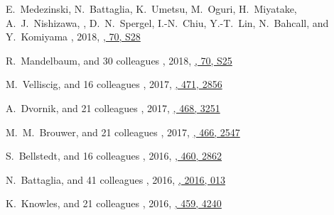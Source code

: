 \begin{etaremune}
\item
E.~Medezinski, N.~Battaglia, K.~Umetsu, M.~Oguri, H.~Miyatake, A.~J.~Nishizawa, \myself, D.~N.~Spergel, I.-N.~Chiu, Y.-T.~Lin, N.~Bahcall, and Y.~Komiyama
,
2018, \href{https://ui.adsabs.harvard.edu/abs/2018PASJ...70S..28M}{\pasj, 70, S28}

\item
R.~Mandelbaum, and 30 colleagues
,
2018, \href{https://ui.adsabs.harvard.edu/abs/2018PASJ...70S..25M}{\pasj, 70, S25}

\item
M.~Velliscig, and 16 colleagues
,
2017, \href{https://ui.adsabs.harvard.edu/abs/2017MNRAS.471.2856V}{\mnras, 471, 2856}

\item
A.~Dvornik, and 21 colleagues
,
2017, \href{https://ui.adsabs.harvard.edu/abs/2017MNRAS.468.3251D}{\mnras, 468, 3251}

\item
M.~M.~Brouwer, and 21 colleagues
,
2017, \href{https://ui.adsabs.harvard.edu/abs/2017MNRAS.466.2547B}{\mnras, 466, 2547}

\item
S.~Bellstedt, and 16 colleagues
,
2016, \href{https://ui.adsabs.harvard.edu/abs/2016MNRAS.460.2862B}{\mnras, 460, 2862}

\item
N.~Battaglia, and 41 colleagues
,
2016, \href{https://ui.adsabs.harvard.edu/abs/2016JCAP...08..013B}{\jcap, 2016, 013}

\item
K.~Knowles, and 21 colleagues
,
2016, \href{https://ui.adsabs.harvard.edu/abs/2016MNRAS.459.4240K}{\mnras, 459, 4240}


\end{etaremune}
